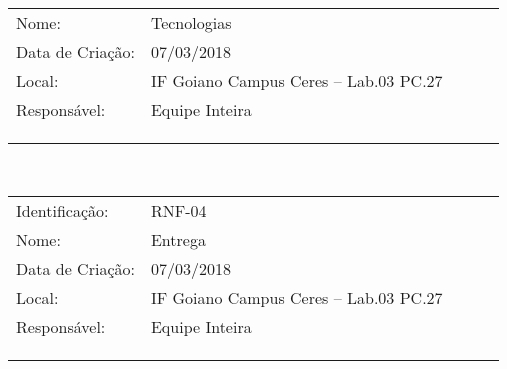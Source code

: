 \begin{center}
\begin{tabular*}{\textwidth}{@{\extracolsep{\fill}}V{2.5}gV{2.5}lV{2.5}}
    \myhline
    Nome:&Tecnologias\\
    \myhline
    Data de Criação:&07/03/2018\\
    \myhline
    Local:&IF Goiano Campus Ceres – Lab.03 PC.27\\
    \myhline
    Responsável:&Equipe Inteira\\    
    \myhline
    \\
    \myhline
    \\
    \myhline
 \end{tabular*}\\
\vspace{0.5cm}
\begin{tabular*}{\textwidth}{@{\extracolsep{\fill}}V{2.5}gV{2.5}lV{2.5}}
    \myhline
    Identificação:& RNF-04\\
    \myhline
    Nome:&Entrega\\
    \myhline
    Data de Criação:&07/03/2018\\
    \myhline
    Local:&IF Goiano Campus Ceres – Lab.03 PC.27\\
    \myhline
    Responsável:&Equipe Inteira\\    
    \myhline
    \\
    \myhline
    \\
    \myhline
 \end{tabular*}\\
\vspace{0.5cm}

\end{center}
